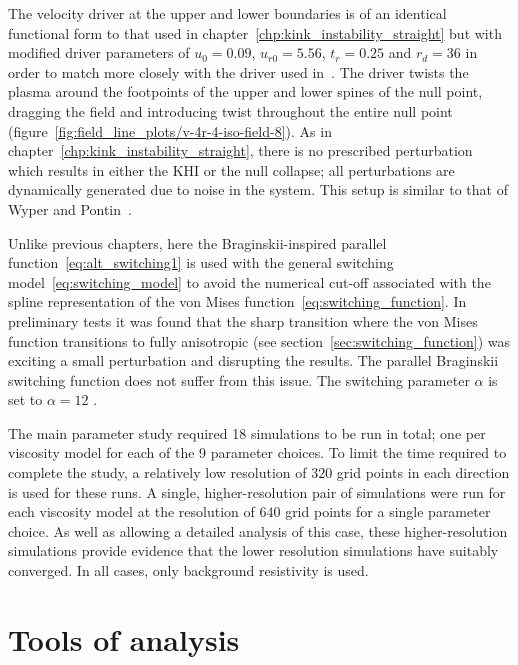 The velocity driver at the upper and lower boundaries is of an identical functional form to that used in chapter~\ref{chp:kink_instability_straight} but with modified driver parameters of $u_0 = 0.09$, $u_{r0} = 5.56$, $t_r = 0.25$ and $r_d = 36$ in order to match more closely with the driver used in~\cite{wyperKelvinHelmholtzInstabilityCurrentvortex2013}. The driver twists the plasma around the footpoints of the upper and lower spines of the null point, dragging the field and introducing twist throughout the entire null point (figure~\ref{fig:field_line_plots/v-4r-4-iso-field-8}). As in chapter~\ref{chp:kink_instability_straight}, there is no prescribed perturbation which results in either the KHI or the null collapse; all perturbations are dynamically generated due to noise in the system. This setup is similar to that of Wyper and Pontin~\cite{wyperKelvinHelmholtzInstabilityCurrentvortex2013}. 

Unlike previous chapters, here the Braginskii-inspired parallel function~\eqref{eq:alt_switching1} is used with the general switching model~\eqref{eq:switching_model} to avoid the numerical cut-off associated with the spline representation of the von Mises function~\eqref{eq:switching_function}. In preliminary tests it was found that the sharp transition where the von Mises function transitions to fully anisotropic (see section~\ref{sec:switching_function}) was exciting a small perturbation and disrupting the results. The parallel Braginskii switching function does not suffer from this issue. The switching parameter $\alpha$ is set to $\alpha=12$ .

The main parameter study required 18 simulations to be run in total; one per viscosity model for each of the 9 parameter choices. To limit the time required to complete the study, a relatively low resolution of $320$ grid points in each direction is used for these runs. A single, higher-resolution pair of simulations were run for each viscosity model at the resolution of $640$ grid points for a single parameter choice. As well as allowing a detailed analysis of this case, these higher-resolution simulations provide evidence that the lower resolution simulations have suitably converged. In all cases, only background resistivity is used.

\section{Tools of analysis}

